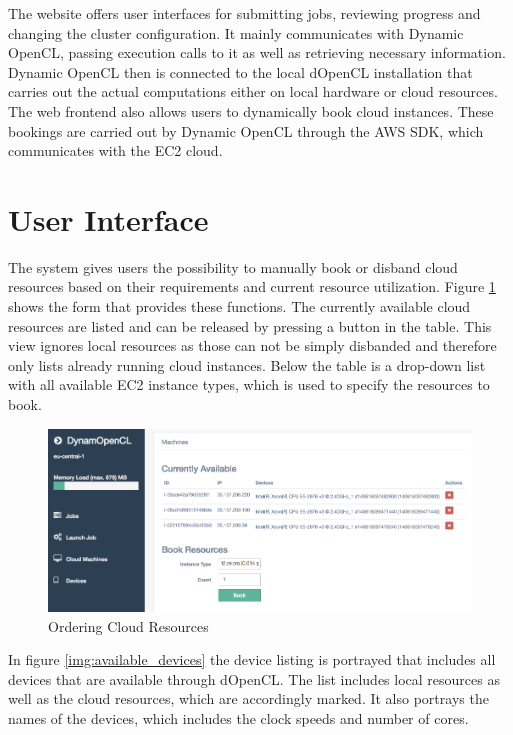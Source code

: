 The website offers user interfaces for submitting jobs, reviewing progress and changing the cluster configuration. It mainly communicates with Dynamic OpenCL, passing execution calls to it as well as retrieving necessary information. Dynamic OpenCL then is connected to the local dOpenCL installation that carries out the actual computations either on local hardware or cloud resources. The web frontend also allows users to dynamically book cloud instances. These bookings are carried out by Dynamic OpenCL through the AWS SDK, which communicates with the EC2 cloud.
\section{User Interface}

The system gives users the possibility to manually book or disband cloud resources based on their requirements and current resource utilization. Figure \ref{img:machine_order} shows the form that provides these functions. The currently available cloud resources are listed and can be released by pressing a button in the table. This view ignores local resources as those can not be simply disbanded and therefore only lists already running cloud instances. Below the table is a drop-down list with all available EC2 instance types, which is used to specify the resources to book.

\begin{figure}[!htb]
	\includegraphics[width=1\textwidth]{screenshots/machine_order.png}
	\centering
	\caption{Ordering Cloud Resources}
	\label{img:machine_order}
\end{figure}

In figure \ref{img:available_devices} the device listing is portrayed that includes all devices that are available through dOpenCL. The list includes local resources as well as the cloud resources, which are accordingly marked. It also portrays the names of the devices, which includes the clock speeds and number of cores.

